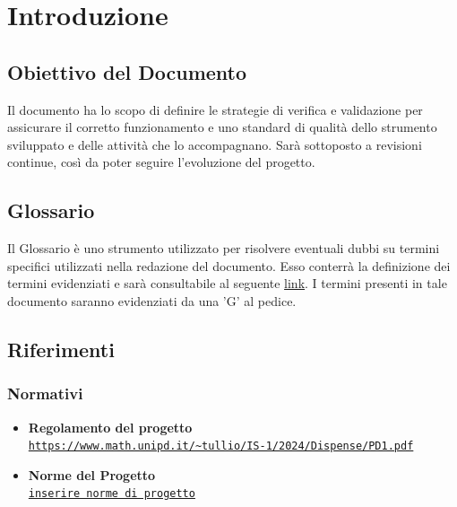 \documentclass{article}
\begin{document}
\section{Introduzione}
\subsection{Obiettivo del Documento}
Il documento ha lo scopo di definire le strategie di verifica e validazione per assicurare il corretto funzionamento e uno standard di qualità
dello strumento sviluppato e delle attività che lo accompagnano. Sarà sottoposto a revisioni continue, così da poter seguire l'evoluzione del progetto.

\subsection{Glossario}
Il Glossario è uno strumento utilizzato per risolvere eventuali dubbi su termini specifici utilizzati nella redazione del documento. Esso conterrà la definizione dei 
termini evidenziati e sarà consultabile al seguente \href{https://code7crusaders.github.io/docs/RTB/documentazione_interna/glossario.html}{link}. I termini presenti in tale documento
saranno evidenziati da una 'G' al pedice.

\subsection{Riferimenti}
\subsubsection{Normativi}
\begin{itemize}
    \item \textbf{Regolamento del progetto} \\ \texttt{\url{https://www.math.unipd.it/~tullio/IS-1/2024/Dispense/PD1.pdf}}
    \item \textbf{Norme del Progetto} \\ \texttt{\url{inserire norme di progetto}}
\end{itemize}
\end{document}
